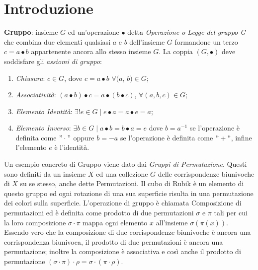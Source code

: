 \documentclass[a4paper,12pt]{tesiinfo}
\begin{document}
\maketitle
\contentspage
\chapter{Introduzione}


%
%
%
\textbf{Gruppo}: insieme $G$ ed un'operazione $\bullet$ detta \textit{Operazione o Legge del gruppo G} che combina due elementi qualsiasi $a$ e $b$ dell'insieme $G$ formandone un terzo $c = a\bullet b$ appartenente ancora allo stesso insieme $G$. 
La coppia $(G, \bullet)$ deve soddisfare gli \textit{assiomi di gruppo}:
\begin{enumerate}
    \item \textit{Chiusura}: $ c \in G$, dove $c = a\bullet b$ $ \forall (a$, $b) \in G$;
    \item \textit{Associativit\`a}: $\left ( a\bullet b \right ) \bullet c = a \bullet \left ( b \bullet c \right ) $, $ \forall (a, b, c) \in G$;
    \item \textit{Elemento Identit\`a}: $ \exists ! e \in G \mid e \bullet a = a \bullet e = a$;
    \item \textit{Elemento Inverso}: $\exists b \in G \mid a \bullet b = b \bullet a = e$ dove $b = a^{-1} $ se l'operazione \`e definita come $"\cdot"$ oppure $b = -a $ se l'operazione \`e definita come $"+"$, infine l'elemento $e$ \`e l'identit\`a.
\end{enumerate}
Un esempio concreto di Gruppo viene dato dai \textit{Gruppi di Permutazione}. Questi sono definiti da un insieme $X$ ed una collezione $G$ delle corrispondenze biunivoche di $X$ su se stesso, anche dette Permutazioni. Il cubo di Rubik \`e un elemento di questo gruppo ed ogni rotazione di una sua superficie risulta in una permutazione dei colori sulla superficie. 
\newline
L'operazione di gruppo \`e chiamata Composizione di permutazioni ed \`e definita come prodotto di due permutazioni $\sigma$ e $\pi$ tali per cui la loro composizione $\sigma \cdot \pi$ mappa ogni elemento $x$ all'insieme $\sigma ( \pi ( x ) )$. Essendo vero che la composizione di due corrispondenze biunivoche \`e ancora una corrispondenza biunivoca, il prodotto di due permutazioni \`e ancora una permutazione; inoltre la composizione \`e associativa e cos\`i anche il prodotto di permutazione $ (\sigma \cdot \pi) \cdot \rho = \sigma \cdot ( \pi \cdot \rho )$.
\end{document}
